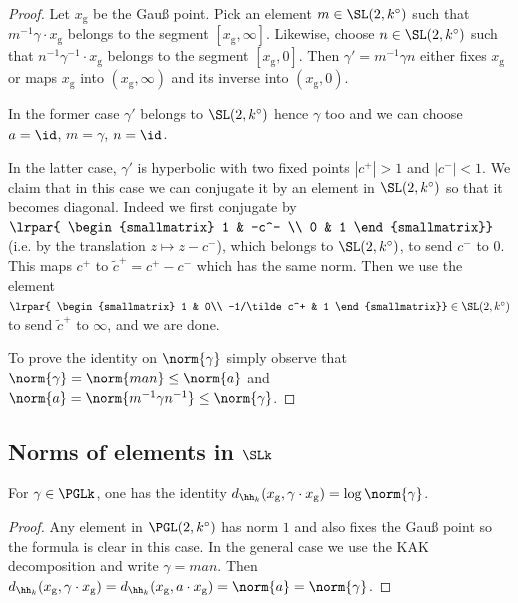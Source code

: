 \begin{proof}
Let $x_{\mathrm{g}}$ be the Gau{\ss} point. Pick an element $m\in \SL(2,k^\circ)$ such that $m^{-1} \gamma\cdot x_{\mathrm{g}}$ belongs to the segment $[x_{\mathrm{g}}, \infty]$. Likewise, choose $n\in \SL(2,k^\circ)$ such that $n^{-1} \gamma^{-1} \cdot x_{\mathrm{g}}$ belongs to the segment $[x_{\mathrm{g}}, 0]$. Then $\gamma' = m^{-1} \gamma n$ either fixes $x_{\mathrm{g}}$ or maps $x_{\mathrm{g}}$ into $(x_{\mathrm{g}}, \infty)$ and its inverse into $(x_{\mathrm{g}},0)$.

In the former case $\gamma'$ belongs to $\SL(2,k^\circ)$ hence $\gamma$ too and we can choose $a = \id$, $m = \gamma$, $n=\id$.

In the latter case, $\gamma'$ is hyperbolic with two fixed points $|c^+| >1$ and $|c^-|<1$. We claim that in this case we can conjugate it by an element in $\SL(2,k^\circ)$ so that it becomes diagonal. Indeed we first conjugate by $\lrpar{
\begin{smallmatrix}
1 & -c^- \\ 0 & 1
\end{smallmatrix}}$ (i.e. by the translation $z\mapsto z-c^-$), which belongs to $\SL(2,k^\circ)$, to send $c^-$ to 0. This maps $c^+$ to $ \tilde c^+ = c^+ - c^-$ which has the same norm. Then we use the element $\lrpar{
\begin{smallmatrix}
1 & 0\\ -1/\tilde c^+ & 1
\end{smallmatrix}}\in \SL(2,k^\circ)$ to send $ \tilde c^+$ to $\infty$, and we are done.

To prove the identity on $\norm{\gamma}$ simply observe that $\norm{\gamma} = \norm{man} \le \norm{a}$ and $ \norm{a} = \norm{m^{-1} \gamma n^{-1}} \le \norm{\gamma}$.
\end{proof}

\subsection{Norms of elements in \texorpdfstring{$\SLk$}{SLk}}

\begin{lemm}
For $\gamma\in \PGLk$, one has the identity $d_{\hh_k}(x_{\mathrm{g}}, \gamma\cdot x_{\mathrm{g}}) = \log \norm{\gamma}$.
\end{lemm}

\begin{proof}
Any element in $\PGL(2,k^\circ)$ has norm $1$ and also fixes the Gau{\ss} point so the formula is clear in this case. In the general case we use the KAK decomposition and write $\gamma = man$. Then $d_{\hh_k}(x_{\mathrm{g}}, \gamma\cdot x_{\mathrm{g}}) = d_{\hh_k}(x_{\mathrm{g}}, a \cdot x_{\mathrm{g}}) = \norm{a}=\norm{\gamma}$.
\end{proof}

